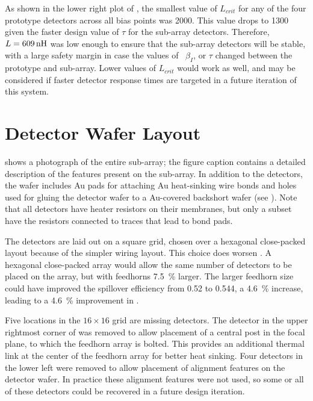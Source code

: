 As shown in the lower right plot of , the smallest value of $L_{crit}$ for any of the four prototype detectors across all bias points was \SI{2000}{\nH}.
This value drops to \SI{1300}{\nH} given the faster design value of $\tau$ for the sub-array detectors.
Therefore, $L = \SI{609}{\nH}$ was low enough to ensure that the sub-array detectors will be stable, with a large safety margin in case the values of \Loop\, $\beta_I$, or $\tau$ changed between the prototype and sub-array.
Lower values of $L_{crit}$ would work as well, and may be considered if faster detector response times are targeted in a future iteration of this system.

\section{Detector Wafer Layout} \label{sec:ch5-layout}

 shows a photograph of the entire sub-array; the figure caption contains a detailed description of the features present on the sub-array.
In addition to the detectors, the wafer includes Au pads for attaching Au heat-sinking wire bonds and holes used for gluing the detector wafer to a Au-covered backshort wafer (see ).
Note that all detectors have heater resistors on their membranes, but only a subset have the resistors connected to traces that lead to bond pads.

The detectors are laid out on a square grid, chosen over a hexagonal close-packed layout because of the simpler wiring layout.
This choice does worsen \NETD.
A hexagonal close-packed array would allow the same number of detectors to be placed on the array, but with feedhorns \SI{7.5}{\percent} larger.
The larger feedhorn size could have improved the spillover efficiency from \num{0.52} to \num{0.544}, a \SI{4.6}{\percent} increase, leading to a \SI{4.6}{\percent} improvement in \NETD.

Five locations in the $16 \times 16$ grid are missing detectors.
The detector in the upper rightmost corner of  was removed to allow placement of a central post in the focal plane, to which the feedhorn array is bolted.
This provides an additional thermal link at the center of the feedhorn array for better heat sinking.
Four detectors in the lower left were removed to allow placement of alignment features on the detector wafer.
In practice these alignment features were not used, so some or all of these detectors could be recovered in a future design iteration.


